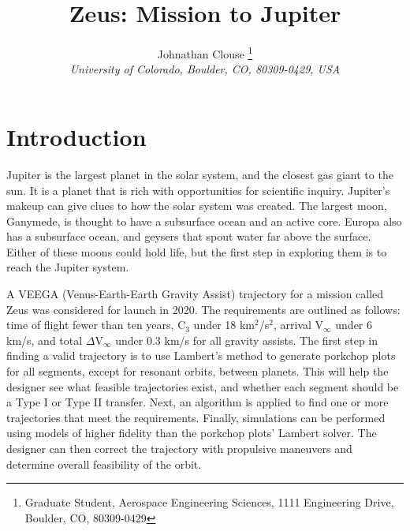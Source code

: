 \documentclass[]{aiaa-tc}%
\title{Zeus: Mission to Jupiter}
\author{
	Johnathan Clouse%
	\thanks{Graduate Student, Aerospace Engineering Sciences, 1111 Engineering Drive, Boulder, CO, 80309-0429}\\
	{\normalsize\itshape
		University of Colorado, Boulder, CO, 80309-0429, USA}
}
\begin{document}
	

	
	\maketitle
	
	\begin{abstract}
		\noindent 
		
	\end{abstract}
	
	\newpage
	
	\tableofcontents
	
	\newpage

	\section{Introduction}
Jupiter is the largest planet in the solar system, and the closest gas giant to the sun. It is a planet that is rich with opportunities for scientific inquiry. Jupiter's makeup can give clues to how the solar system was created. The largest moon, Ganymede, is thought to have a subsurface ocean and an active core. Europa also has a subsurface ocean, and geysers that spout water far above the surface. Either of these moons could hold life, but the first step in exploring them is to reach the Jupiter system.
	
	\vspace{5 mm}

A VEEGA (Venus-Earth-Earth Gravity Assist) trajectory for a mission called Zeus was considered for launch in 2020. The requirements are outlined as follows: time of flight fewer than ten years, C$_3$ under 18 km$^2$/s$^2$, arrival V$_\infty$ under 6 km/s, and total $\Delta$V$_\infty$ under 0.3 km/s for all gravity assists. The first step in finding a valid trajectory is to use Lambert's method to generate porkchop plots for all segments, except for resonant orbits, between planets. This will help the designer see what feasible trajectories exist, and whether each segment should be a Type I or Type II transfer. Next, an algorithm is applied to find one or more trajectories that meet the requirements. Finally, simulations can be performed using models of higher fidelity than the porkchop plots' Lambert solver. The designer can then correct the trajectory with propulsive maneuvers and determine overall feasibility of the orbit. 
\end{document}
